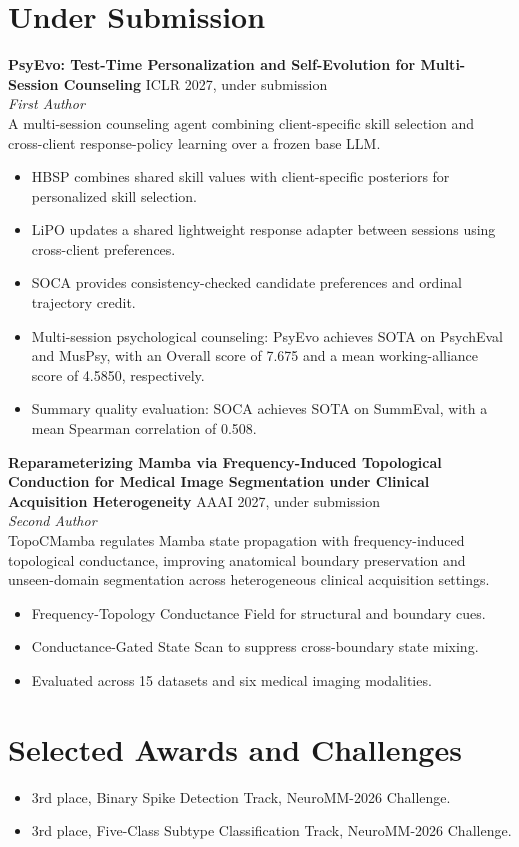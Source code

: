 \documentclass[10pt,letterpaper]{article}
\newcommand{\paper}[5]{
  \textbf{#1} \hfill {\color{textgray}#2}\\
  {\itshape #3}\\
  #4
  \begin{itemize}
    #5
  \end{itemize}
}
\begin{document}
\section{Under Submission}
\paper
  {PsyEvo: Test-Time Personalization and Self-Evolution for Multi-Session Counseling}
  {ICLR 2027, under submission}
  {First Author}
  {A multi-session counseling agent combining client-specific skill selection and cross-client response-policy learning over a frozen base LLM.}
  {
    \item HBSP combines shared skill values with client-specific posteriors for personalized skill selection.
    \item LiPO updates a shared lightweight response adapter between sessions using cross-client preferences.
    \item SOCA provides consistency-checked candidate preferences and ordinal trajectory credit.
    \item Multi-session psychological counseling: PsyEvo achieves SOTA on PsychEval and MusPsy, with an Overall score of 7.675 and a mean working-alliance score of 4.5850, respectively.
    \item Summary quality evaluation: SOCA achieves SOTA on SummEval, with a mean Spearman correlation of 0.508.
  }

\vspace{6pt}
\paper
  {Reparameterizing Mamba via Frequency-Induced Topological Conduction for Medical Image Segmentation under Clinical Acquisition Heterogeneity}
  {AAAI 2027, under submission}
  {Second Author}
  {TopoCMamba regulates Mamba state propagation with frequency-induced topological conductance, improving anatomical boundary preservation and unseen-domain segmentation across heterogeneous clinical acquisition settings.}
  {
    \item Frequency-Topology Conductance Field for structural and boundary cues.
    \item Conductance-Gated State Scan to suppress cross-boundary state mixing.
    \item Evaluated across 15 datasets and six medical imaging modalities.
  }

\section{Selected Awards and Challenges}
\begin{itemize}
  \item 3rd place, Binary Spike Detection Track, NeuroMM-2026 Challenge.
  \item 3rd place, Five-Class Subtype Classification Track, NeuroMM-2026 Challenge.
\end{itemize}
\end{document}
